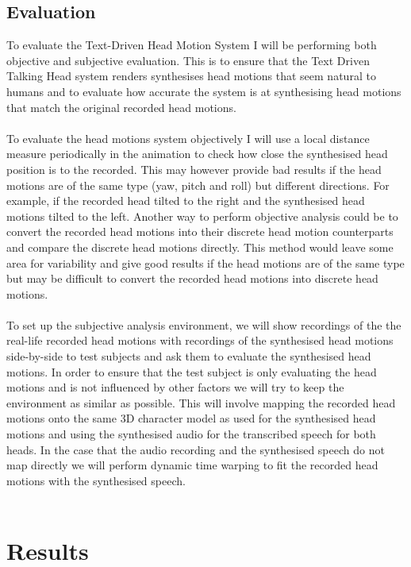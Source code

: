 \documentclass[bsc,frontabs,twoside,singlespacing,parskip]{infthesis}
\begin{document}
\section{Evaluation}
To evaluate the Text-Driven Head Motion System I will be performing both objective  and subjective evaluation. This is to ensure that the Text Driven Talking Head system renders synthesises head motions that seem natural to humans and to evaluate how accurate the system is at synthesising head motions that match the original recorded head motions.
\\
\\
To evaluate the head motions system objectively I will use a local distance measure periodically in the animation to check how close the synthesised head position is to the recorded. This may however provide bad results if the head motions are of the same type (yaw, pitch and roll) but different directions. For example, if the recorded head tilted to the right and the synthesised head motions tilted to the left. Another way to perform objective analysis could be to convert the recorded head motions into their discrete head motion counterparts and compare the discrete head motions directly. This method would leave some area for variability and give good results if the head motions are of the same type but may be difficult to convert the recorded head motions into discrete head motions.
\\
\\
To set up the subjective analysis environment, we will show recordings of  the the real-life recorded head motions with recordings of the synthesised head motions side-by-side to test subjects and ask them to evaluate the synthesised head motions. In order to ensure that the test subject is only evaluating the head motions and is not influenced by other factors we will try to keep the environment as similar as possible. This will involve mapping the recorded head motions onto the same 3D character model as used for the synthesised head motions and using the synthesised audio for the transcribed speech for both heads. In the case that the audio recording and the synthesised speech do not map directly we will perform dynamic time warping to fit the recorded head motions with the synthesised speech.
\\
\\

\chapter{Results}




\end{document}
